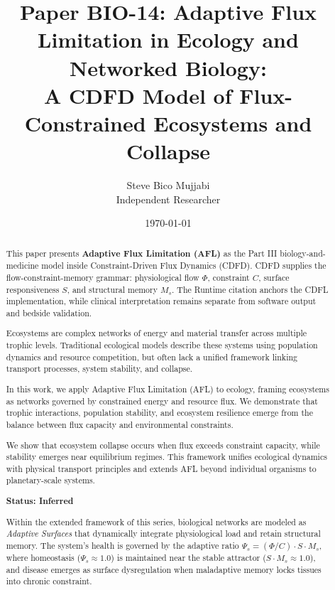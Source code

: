 \documentclass[11pt]{article}
\title{\textbf{Paper BIO-14: Adaptive Flux Limitation in Ecology and Networked Biology:\\ A CDFD Model of Flux-Constrained Ecosystems and Collapse}}
\author{Steve Bico Mujjabi\\ \small Independent Researcher}
\date{\today}
\begin{document}
\maketitle

\begin{abstract}

This paper presents \textbf{Adaptive Flux Limitation (AFL)} as the Part III biology-and-medicine model inside Constraint-Driven Flux Dynamics (CDFD). CDFD supplies the flow-constraint-memory grammar: physiological flow $\Phi$, constraint $C$, surface responsiveness $S$, and structural memory $M_s$. The Runtime citation anchors the CDFL implementation, while clinical interpretation remains separate from software output and bedside validation.


Ecosystems are complex networks of energy and material transfer across multiple trophic levels. Traditional ecological models describe these systems using population dynamics and resource competition, but often lack a unified framework linking transport processes, system stability, and collapse.

In this work, we apply Adaptive Flux Limitation (AFL) to ecology, framing ecosystems as networks governed by constrained energy and resource flux. We demonstrate that trophic interactions, population stability, and ecosystem resilience emerge from the balance between flux capacity and environmental constraints.

We show that ecosystem collapse occurs when flux exceeds constraint capacity, while stability emerges near equilibrium regimes. This framework unifies ecological dynamics with physical transport principles and extends AFL beyond individual organisms to planetary-scale systems.

\textbf{Status: Inferred}

\medskip
\noindent Within the extended framework of this series, biological networks are modeled as \emph{Adaptive Surfaces} that dynamically integrate physiological load and retain structural memory. The system's health is governed by the adaptive ratio $\Psi_s = (\Phi/C) \cdot S \cdot M_s$, where homeostasis ($\Psi_s \approx 1.0$) is maintained near the stable attractor ($S \cdot M_s \approx 1.0$), and disease emerges as surface dysregulation when maladaptive memory locks tissues into chronic constraint.

\end{abstract}
\end{document}
